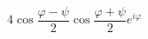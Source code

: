 \begin{displaymath}
 4\cos\frac{\varphi - \psi}{2}\cos\frac{\varphi + \psi}{2}e^{i\varphi}
\end{displaymath}



